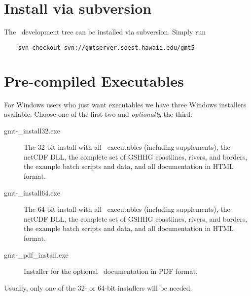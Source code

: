 \section{Install via subversion}

The \GMT\ development tree can be installed via subversion.  Simply run
\begin{verbatim}
	svn checkout svn://gmtserver.soest.hawaii.edu/gmt5
\end{verbatim}

\section{Pre-compiled Executables}

For Windows users who just want executables we have three Windows installers available.  Choose one
of the first two and \emph{optionally} the third:

\begin{description}

\item[gmt-\GMTDOCVERSION\_install32.exe] The 32-bit install with all \GMT\ executables (including supplements),
the netCDF DLL, the complete set of GSHHG coastlines, rivers, and borders, the example batch scripts and data, and all documentation in HTML format.

\item[gmt-\GMTDOCVERSION\_install64.exe] The 64-bit install with all \GMT\ executables (including supplements),
the netCDF DLL, the complete set of GSHHG coastlines, rivers, and borders, the example batch scripts and data, and all documentation in HTML format.

\item[gmt-\GMTDOCVERSION\_pdf\_install.exe] Installer for the optional \GMT\ documentation in PDF format.

\end{description}
Usually, only one of the 32- or 64-bit installers will be needed.

